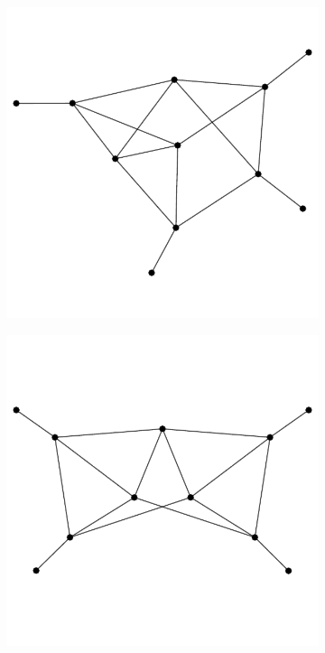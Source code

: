\documentclass[11pt,a4paper]{article}
\renewcommand{\|}{\rule[-0.4ex]{0.2ex}{1.2em}}
\begin{document}
\begin{figure}[htb]
\begin{subfigure}[b]{.24 \textwidth}
		\subcaption{}
	\end{subfigure}
	\begin{subfigure}[b]{.24 \textwidth}
		\includegraphics[width=\linewidth]{graph_dec2}
		\subcaption{}
	\end{subfigure}
	\begin{subfigure}[b]{.24 \textwidth}
		\includegraphics[width=\linewidth]{graph_dec3}
		\subcaption{}
	\end{subfigure}
	

\end{figure}
\end{document}
